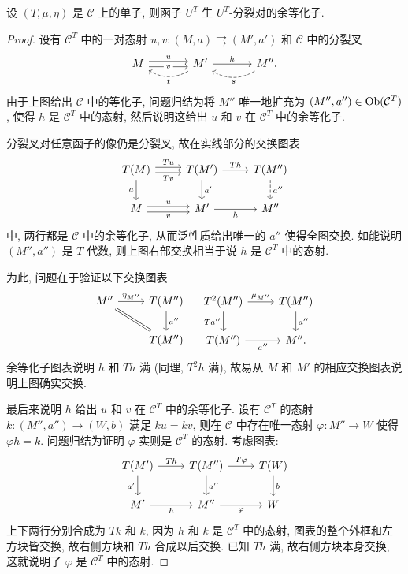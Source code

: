 \begin{lemma}\label{prop:UT-split-fork}
	设 $(T, \mu, \eta)$ 是 $\mathcal{C}$ 上的单子, 则函子 $U^T$ 生 $U^T$-分裂对的余等化子.
\end{lemma}
\begin{proof}
	设有 $\mathcal{C}^T$ 中的一对态射 $u, v: (M, a) \rightrightarrows (M', a')$ 和 $\mathcal{C}$ 中的分裂叉
	\begin{equation*}\begin{tikzcd}[column sep=large]
		M \arrow[shift left, r, "u"] \arrow[shift right, r, "v" description] & M' \arrow[r, "h"] \arrow[dashed, l, bend left, "t"] & M'' \arrow[dashed, l, bend left, "s"].
	\end{tikzcd}\end{equation*}
	由于上图给出 $\mathcal{C}$ 中的等化子, 问题归结为将 $M''$ 唯一地扩充为 $(M'', a'') \in \operatorname{Ob}(\mathcal{C}^T)$, 使得 $h$ 是 $\mathcal{C}^T$ 中的态射, 然后说明这给出 $u$ 和 $v$ 在 $\mathcal{C}^T$ 中的余等化子.
	
	分裂叉对任意函子的像仍是分裂叉, 故在实线部分的交换图表
	\[\begin{tikzcd}
		T(M) \arrow[shift left, r, "Tu"] \arrow[shift right, r, "Tv"'] \arrow[d, "a"'] & T(M') \arrow[r, "Th"] \arrow[d, "{a'}"] & T(M'') \arrow[dashed, d, "{a''}"] \\
		M \arrow[shift left, r, "u"] \arrow[shift right, r, "v"'] & M' \arrow[r, "h"'] & M''
	\end{tikzcd}\]
	中, 两行都是 $\mathcal{C}$ 中的余等化子, 从而泛性质给出唯一的 $a''$ 使得全图交换. 如能说明 $(M'', a'')$ 是 $T$-代数, 则上图右部交换相当于说 $h$ 是 $\mathcal{C}^T$ 中的态射.
	
	为此, 问题在于验证以下交换图表
	\[\begin{tikzcd}
		M'' \arrow[r, "{\eta_{M''}}"] \arrow[equal, rd] & T(M'') \arrow[d, "{a''}"] \\
		& T(M'')
	\end{tikzcd} \quad
	\begin{tikzcd}
		T^2(M'') \arrow[r, "{\mu_{M''}}"] \arrow[d, "{Ta''}"'] & T(M'') \arrow[d, "{a''}"] \\
		T(M'') \arrow[r, "{a''}"'] & M'' .
	\end{tikzcd}\]
	余等化子图表说明 $h$ 和 $Th$ 满 (同理, $T^2 h$ 满), 故易从 $M$ 和 $M'$ 的相应交换图表说明上图确实交换.
	
	最后来说明 $h$ 给出 $u$ 和 $v$ 在 $\mathcal{C}^T$ 中的余等化子. 设有 $\mathcal{C}^T$ 的态射 $k: (M'', a'') \to (W, b)$ 满足 $ku = kv$, 则在 $\mathcal{C}$ 中存在唯一态射 $\varphi: M'' \to W$ 使得 $\varphi h = k$. 问题归结为证明 $\varphi$ 实则是 $\mathcal{C}^T$ 的态射. 考虑图表:
	\[\begin{tikzcd}
		T(M') \arrow[r, "Th"] \arrow[d, "{a'}"'] & T(M'') \arrow[r, "T\varphi"] \arrow[d, "{a''}"] & T(W) \arrow[d, "b"] \\
		M' \arrow[r, "h"'] & M'' \arrow[r, "\varphi"'] & W
	\end{tikzcd}\]
	上下两行分别合成为 $Tk$ 和 $k$, 因为 $h$ 和 $k$ 是 $\mathcal{C}^T$ 中的态射, 图表的整个外框和左方块皆交换, 故右侧方块和 $Th$ 合成以后交换. 已知 $Th$ 满, 故右侧方块本身交换, 这就说明了 $\varphi$ 是 $\mathcal{C}^T$ 中的态射.
\end{proof}

